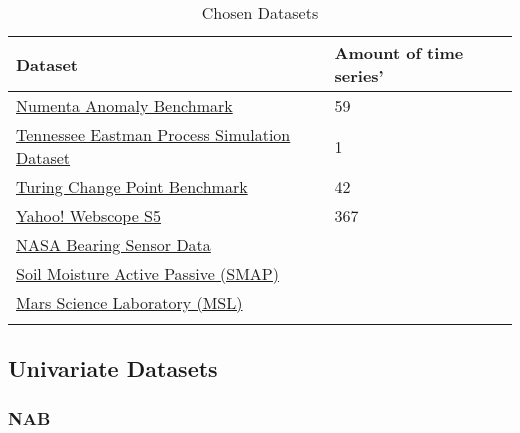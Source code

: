 \begin{table}[h]\centering
        \begin{tabular}{l}
            Dataset                                                                                                                             & Amount of time series'\\\midrule
            \href{https://github.com/numenta/NAB}{Numenta Anomaly Benchmark}                                                                    &  59   \\\addlinespace
            \href{https://www.kaggle.com/averkij/tennessee-eastman-process-simulation-dataset}{Tennessee Eastman Process Simulation Dataset}    &  1    \\\addlinespace
            \href{https://github.com/alan-turing-institute/TCPDBench}{Turing Change Point Benchmark}                                            &  42   \\\addlinespace
            \href{https://webscope.sandbox.yahoo.com/catalog.php?datatype=s\&did=70}{Yahoo! Webscope S5}                                        &  367  \\\addlinespace
            \href{https://www.kaggle.com/rkuo2000/nasa-bearing-sensor-data/notebooks}{NASA Bearing Sensor Data}                                 &                   \\\addlinespace
            \href{https://github.com/khundman/telemanom}{Soil Moisture Active Passive (SMAP)}                                                   &                   \\\addlinespace
            \href{https://github.com/khundman/telemanom}{Mars Science Laboratory  (MSL)}                                                        &                   \\\addlinespace
        \end{tabular}
        \caption{Chosen Datasets}\label{tab:chosen-datasets}
\end{table}



\subsection{Univariate Datasets}
\subsubsection{NAB}
